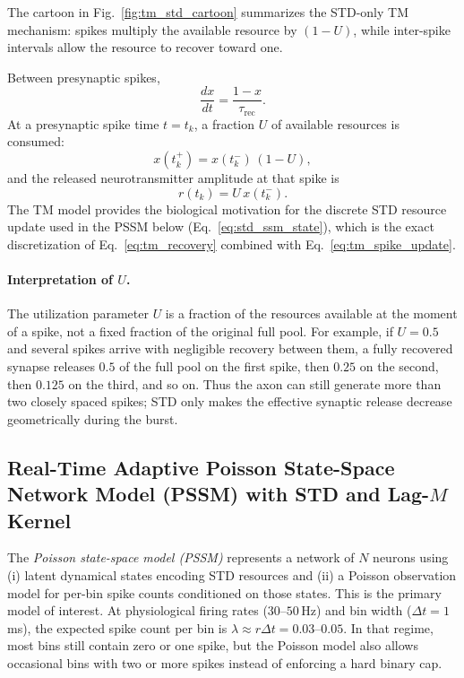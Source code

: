 \documentclass[11pt]{article}
\begin{document}
\noindent
The cartoon in Fig.~\ref{fig:tm_std_cartoon} summarizes the STD-only TM mechanism:
spikes multiply the available resource by $(1-U)$, while inter-spike intervals allow
the resource to recover toward one.

\noindent
Between presynaptic spikes,
\begin{equation}
\frac{dx}{dt}=\frac{1-x}{\tau_{\mathrm{rec}}}.
\label{eq:tm_recovery}
\end{equation}
At a presynaptic spike time $t=t_k$, a fraction $U$ of available resources is consumed:
\begin{equation}
x(t_k^+)=x(t_k^-)\,(1-U),
\label{eq:tm_spike_update}
\end{equation}
and the released neurotransmitter amplitude at that spike is
\begin{equation}
r(t_k)=U\,x(t_k^-).
\label{eq:tm_release}
\end{equation}
The TM model provides the biological motivation for the discrete STD resource update
used in the PSSM below (Eq.~\ref{eq:std_ssm_state}), which is the exact discretization
of Eq.~\eqref{eq:tm_recovery} combined with Eq.~\eqref{eq:tm_spike_update}.

\paragraph{Interpretation of $U$.}
The utilization parameter $U$ is a fraction of the resources available at the
moment of a spike, not a fixed fraction of the original full pool. For example,
if $U=0.5$ and several spikes arrive with negligible recovery between them, a
fully recovered synapse releases $0.5$ of the full pool on the first spike,
then $0.25$ on the second, then $0.125$ on the third, and so on. Thus the axon
can still generate more than two closely spaced spikes; STD only makes the
effective synaptic release decrease geometrically during the burst.

\subsection{Real-Time Adaptive Poisson State-Space Network Model (PSSM) with STD
            and Lag-$M$ Kernel}
\label{sec:bssm_std}

The \emph{Poisson state-space model (PSSM)} represents a network of $N$ neurons using
(i) latent dynamical states encoding STD resources and (ii) a Poisson observation model
for per-bin spike counts conditioned on those states. This is the primary model of
interest. At physiological firing rates ($30$--$50$\,Hz) and bin width
($\Delta t = 1$\,ms), the expected spike count per bin is
$\lambda \approx r\Delta t = 0.03$--$0.05$. In that regime, most bins still contain
zero or one spike, but the Poisson model also allows occasional bins with two or more
spikes instead of enforcing a hard binary cap.
\end{document}
